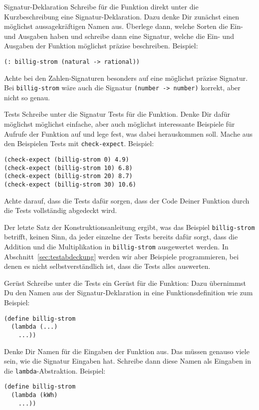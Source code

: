 \begin{konstruktionsanleitung}{Signatur-Deklaration}
  \label{ka:signatur-deklaration}
  Schreibe für die Funktion direkt unter die Kurzbeschreibung eine
  Signatur-Deklaration.  Dazu denke Dir zunächst einen möglichst
  aussagekräftigen Namen aus.  Überlege dann, welche Sorten die Ein-
  und Ausgaben haben und schreibe dann eine Signatur, welche die Ein-
  und Ausgaben der Funktion möglichst präzise beschreiben.  Beispiel:
  \begin{lstlisting}
(: billig-strom (natural -> rational))
\end{lstlisting}
  Achte bei den Zahlen-Signaturen besonders auf eine möglichst präzise
  Signatur.  Bei \lstinline{billig-strom} wäre auch die Signatur
  \lstinline{(number -> number)} korrekt, aber nicht so genau.
\end{konstruktionsanleitung}

\begin{konstruktionsanleitung}{Tests}
  \label{ka:tests}
  Schreibe unter die Signatur Tests für die Funktion.  Denke Dir dafür
  möglichst möglichst einfache, aber auch möglichst interessante
  Beispiele für Aufrufe der Funktion auf und lege fest, was dabei
  herauskommen soll.  Mache aus den Beispielen Tests mit
  \lstinline{check-expect}.  Beispiel:
\begin{lstlisting}
(check-expect (billig-strom 0) 4.9)
(check-expect (billig-strom 10) 6.8)
(check-expect (billig-strom 20) 8.7)
(check-expect (billig-strom 30) 10.6)
\end{lstlisting}
  Achte darauf, dass die Tests dafür sorgen, dass der Code Deiner
  Funktion durch die Tests vollständig abgedeckt wird.
\end{konstruktionsanleitung}
%
Der letzte Satz der Konstruktionsanleitung ergibt, was das Beispiel
\lstinline{billig-strom} betrifft, keinen Sinn, da jeder einzelne der
Tests bereits dafür
sorgt, dass die Addition und die Multiplikation in
\lstinline{billig-strom} ausgewertet werden.  In
Abschnitt~\ref{sec:testabdeckung} werden wir aber Beispiele
programmieren, bei denen es nicht selbstverständlich ist, dass die
Tests alles auswerten.

\begin{konstruktionsanleitung}{Gerüst}
  \label{ka:geruest}
  Schreibe unter die Tests ein Gerüst für die Funktion: Dazu
  übernimmst Du den Namen aus der Signatur-Deklaration in eine
  Funktionsdefinition wie zum Beispiel:
\begin{lstlisting}
(define billig-strom
  (lambda (...)
    ...))
\end{lstlisting}
  Denke Dir Namen für die Eingaben der Funktion aus.  Das müssen
  genauso viele sein, wie die Signatur Eingaben hat.  Schreibe dann
  diese Namen als Eingaben in die \lstinline{lambda}-Abstraktion.
  Beispiel:
  \begin{lstlisting}
(define billig-strom
  (lambda (kWh)
    ...))
\end{lstlisting}
\end{konstruktionsanleitung}

